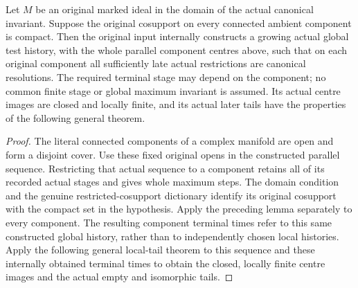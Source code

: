 \begin{theorem}
\label{hir:original-componentwise-compact-locally-terminal-history}
\leanok
Let $M$ be an original marked ideal in the domain of the actual
canonical invariant. Suppose the original cosupport on every
connected ambient component is compact. Then the original input
internally constructs a growing actual global test history,
with the whole parallel component centres above, such that on
each original component all sufficiently late actual restrictions
are canonical resolutions. The required terminal stage may
depend on the component; no common finite stage or global
maximum invariant is assumed. Its actual centre images are closed
and locally finite, and its actual later tails have the properties
of the following general theorem.
\end{theorem}
\begin{proof}
The literal connected components of a complex manifold are
open and form a disjoint cover. Use these fixed original opens
in the constructed parallel sequence. Restricting that actual
sequence to a component retains all of its recorded actual
stages and gives whole maximum steps. The domain condition
and the genuine restricted-cosupport dictionary identify
its original cosupport with the compact set in the hypothesis.
Apply the preceding lemma separately to every component.
The resulting component terminal times refer to this same
constructed global history, rather than to independently
chosen local histories. Apply the following general local-tail
theorem to this sequence and these internally obtained terminal
times to obtain the closed, locally finite centre images and
the actual empty and isomorphic tails.
\end{proof}

